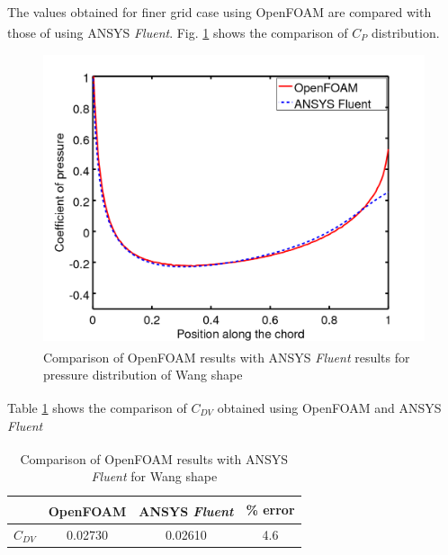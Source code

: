 The values obtained for finer grid case using OpenFOAM\textsuperscript{\textregistered} are compared with those of using ANSYS\textsuperscript{\textregistered} \textit{Fluent}. Fig. \ref{wang comp} shows the comparison of $ C_{P} $ distribution.
\begin{figure}[H]
	\centering
	\includegraphics[width=300 pt]{rnd/wang_cp.png}
	\caption{Comparison of OpenFOAM\textsuperscript{\textregistered} results with ANSYS\textsuperscript{\textregistered} \textit{Fluent} results for pressure distribution of Wang shape}
	\label{wang comp} %
\end{figure}

Table \ref{wang table} shows the comparison of $ C_{DV} $ obtained using OpenFOAM\textsuperscript{\textregistered} and ANSYS\textsuperscript{\textregistered} \textit{Fluent}

\begin{table}[H]
	\centering
	\caption{\label{wang table} Comparison of OpenFOAM\textsuperscript{\textregistered} results with ANSYS\textsuperscript{\textregistered} \textit{Fluent} for Wang shape}
	\begin{tabular}{cccc}
		\hline \hline
		& OpenFOAM\textsuperscript{\textregistered} & ANSYS\textsuperscript{\textregistered} \textit{Fluent} & \% error \\ \hline \hline
		
		$ C_{DV} $ & 0.02730 & 0.02610 & 4.6    \\ \hline
	\end{tabular}
\end{table}


